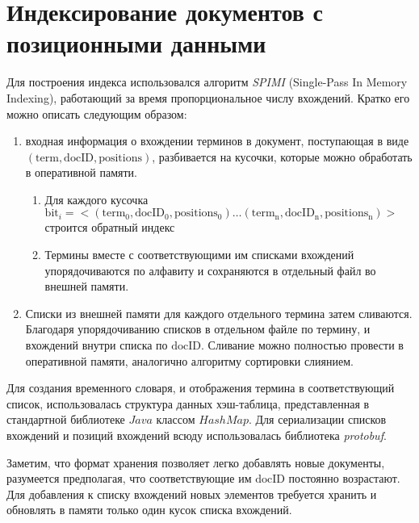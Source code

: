 \documentclass[12pt]{article}
\begin{document}
\section{Индексирование документов с позиционными данными}
Для построения индекса использовался алгоритм \emph{SPIMI} 
(Single-Pass In Memory Indexing), работающий за время пропорциональное числу вхождений. 
Кратко его можно описать следующим образом:
\begin{enumerate}
\item входная информация о вхождении терминов в документ, поступающая в виде
$(\mathrm{term}, \mathrm{docID}, \mathrm{positions})$, разбивается на кусочки, которые можно обработать в оперативной памяти.
\begin{enumerate}
    \item Для каждого кусочка $\mathrm{bit}_i = <(\mathrm{term_0}, \mathrm{docID_0}, \mathrm{positions_0}) \ldots (\mathrm{term_n}, \mathrm{docID_n}, \mathrm{positions_n})>$
строится обратный индекс
    \item Термины вместе с соответствующими им списками вхождений 
    упорядочиваются по алфавиту и сохраняются в отдельный файл во внешней памяти.
\end{enumerate}
\item Списки из внешней памяти для каждого отдельного термина затем сливаются. 
Благодаря упорядочиванию списков в отдельном файле по термину, и вхождений внутри 
списка по $\mathrm{docID}$. Сливание можно полностью провести в оперативной памяти, 
аналогично алгоритму сортировки слиянием.
\end{enumerate}

Для создания временного словаря, и отображения термина в соответствующий список,
использовалась структура данных хэш-таблица, представленная в стандартной библиотеке
$Java$ классом $HashMap$. Для сериализации списков вхождений и позиций вхождений всюду
использовалась библиотека \emph{protobuf}.

Заметим, что формат хранения позволяет легко добавлять новые документы, разумеется 
предполагая, что соответствующие им $\mathrm{docID}$ постоянно возрастают. Для
добавления к списку вхождений новых элементов требуется хранить и обновлять в памяти 
только один кусок списка вхождений.
\end{document}
